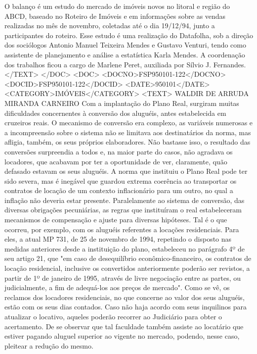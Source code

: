O balanço é um estudo do mercado de imóveis novos no litoral e região do ABCD, baseado no Roteiro de Imóveis e em informações sobre as vendas realizadas no mês de novembro, coletadas até o dia 19/12/94, junto a participantes do roteiro. Esse estudo é uma realização do Datafolha, sob a direção dos sociólogos Antonio Manuel Teixeira Mendes e Gustavo Venturi, tendo como assistente de planejamento e análise a estatística Karla Mendes. A coordenação dos trabalhos ficou a cargo de Marlene Peret, auxiliada por Sílvio J. Fernandes.
</TEXT>
</DOC>
<DOC>
<DOCNO>FSP950101-122</DOCNO>
<DOCID>FSP950101-122</DOCID>
<DATE>950101</DATE>
<CATEGORY>IMÓVEIS</CATEGORY>
<TEXT>
WALDIR DE ARRUDA MIRANDA CARNEIRO 
Com a implantação do Plano Real, surgiram muitas dificuldades concernentes à conversão dos aluguéis, antes estabelecida em cruzeiros reais.
O mecanismo de conversão era complexo, as variáveis numerosas e a incompreensão sobre o sistema não se limitava aos destinatários da norma, mas afligia, também, os seus próprios elaboradores.
Não bastasse isso, o resultado das conversões surpreendia a todos e, na maior parte do casos, não agradava os locadores, que acabavam por ter a oportunidade de ver, claramente, quão defasado estavam os seus aluguéis.
A norma que instituiu o Plano Real pode ter sido severa, mas é inegável que guardou extrema coerência ao transportar os contratos de locação de um contexto inflacionário para um outro, no qual a inflação não deveria estar presente.
Paralelamente ao sistema de conversão, das diversas obrigações pecuniárias, as regras que instituíram o real estabeleceram mecanismos de compensação e ajuste para diversas hipóteses.
Tal é o que ocorreu, por exemplo, com os aluguéis referentes a locações residenciais. Para eles, a atual MP 731, de 25 de novembro de 1994, repetindo o disposto nas medidas anteriores desde a instituição do plano, estabeleceu no parágrafo 4º de seu artigo 21, que "em caso de desequilíbrio econômico-financeiro, os contratos de locação residencial, inclusive os convertidos anteriormente poderão ser revistos, a partir de 1º de janeiro de 1995, através de livre negociação entre as partes, ou judicialmente, a fim de adequá-los aos preços de mercado".
Como se vê, os reclamos dos locadores residenciais, no que concerne ao valor dos seus aluguéis, estão com os seus dias contados. Caso não haja acordo com seus inquilinos para atualizar o locativo, aqueles poderão recorrer ao Judiciário para obter o acertamento.
De se observar que tal faculdade também assiste ao locatário que estiver pagando aluguel superior ao vigente no mercado, podendo, nesse caso, pleitear a redução do mesmo.

